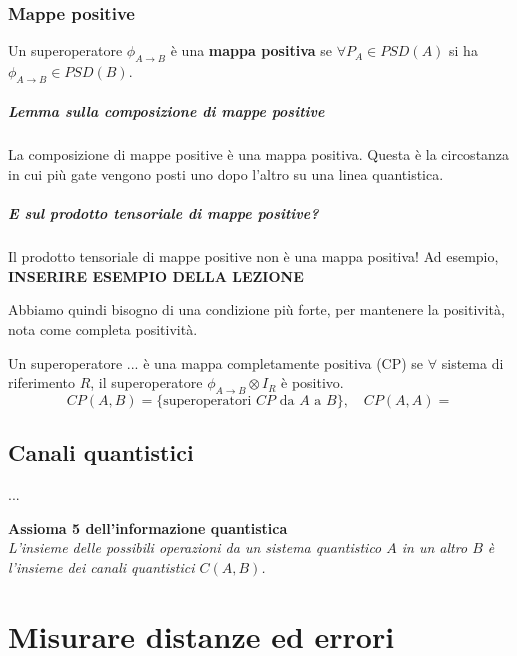 \documentclass{report}
\begin{document}
\subsection{Mappe positive}
Un superoperatore $\phi_{A \to B}$ è una \textbf{mappa positiva} se $\forall P_A \in PSD(A)$ si ha $\phi_{A \to B} \in PSD(B)$.

\paragraph{Lemma sulla composizione di mappe positive} La composizione di mappe positive è una mappa positiva. Questa è la circostanza in cui più gate vengono posti uno dopo l'altro su una linea quantistica.

\paragraph{E sul prodotto tensoriale di mappe positive?}
Il prodotto tensoriale di mappe positive non è una mappa positiva!
Ad esempio, \bf INSERIRE ESEMPIO DELLA LEZIONE\rm


Abbiamo quindi bisogno di una condizione più forte, per mantenere la positività, nota come completa positività. 

Un superoperatore ... è una mappa completamente positiva (CP) se $\forall$ sistema di riferimento $R$, il superoperatore $\phi_{A \to B} \otimes I_R$ è positivo.
\begin{equation}
CP(A,B) = \{\text{superoperatori $CP$ da $A$ a $B$}\}, \quad CP(A,A) =
\end{equation}


\section{Canali quantistici}
...


\begin{center}
	\vspace{3pt}
	\textbf{\Large Assioma 5 dell'informazione quantistica}\\
	\vspace{5pt}
	\it L'insieme delle possibili operazioni da un sistema quantistico $A$ in un altro $B$ è l'insieme dei canali quantistici $C(A,B)$.\rm
\end{center}


\chapter{Misurare distanze ed errori}
\end{document}
